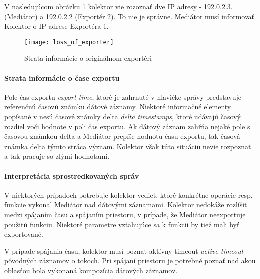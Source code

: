 V nasledujúcom obrázku \ref{o:loss_of_exporter} kolektor vie rozoznať dve IP adresy - 192.0.2.3. (Mediátor) 
a 192.0.2.2 (Exportér 2). To nie je správne. Mediátor musí informovať Kolektor o IP adrese Exportéra 1.

\begin{figure}[ht!]
\centering
\texttt{[image: loss\_of\_exporter]}
\caption{Strata informácie o originálnom exportéri}\label{o:loss_of_exporter}
\end{figure}


\paragraph{Strata informácie o čase exportu} \label{sec:loss_time}

Pole čas exportu \emph{export time}, ktoré je zahrnuté v hlavičke správy predstavuje referenčnú 
časovú známku dátové záznamy. Niektoré informačné elementy popísané v \citep{rfc5102} nesú 
časové známky delta \emph{delta timestamps}, ktoré udávajú časový rozdiel voči hodnote v poli 
čas exportu. Ak dátový záznam zahŕňa nejaké pole s časovou známkou delta a Mediátor prepíše hodnotu 
času exportu,  tak časová známka delta týmto stráca význam. Kolektor však túto situáciu nevie 
rozpoznať a tak pracuje so zlými hodnotami.


\paragraph{Interpretácia sprostredkovaných správ}

V niektorých prípadoch potrebuje kolektor vedieť, ktoré konkrétne operácie resp. funkcie vykonal Mediátor 
nad dátovými záznamami. Kolektor nedokáže rozlíšiť medzi spájaním času a spájaním priestoru, v prípade, že 
Mediátor neexportuje použitú funkciu. Niektoré parametre vzťahujúce sa k funkcii by tiež mali byť 
exportované. 

V prípade spájania času, kolektor musí poznať aktívny timeout \emph{active timeout} 
pôvodných záznamov o tokoch. Pri spájaní priestoru je potrebné poznať nad akou oblasťou bola 
vykonaná kompozícia dátových záznamov.\citep{rfc5982}


